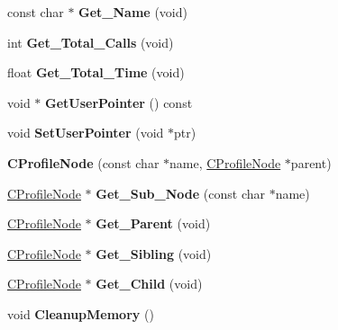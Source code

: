 \begin{DoxyCompactItemize}
const char $\ast$ {\bfseries Get\+\_\+\+Name} (void)
\item 
\mbox{\label{classCProfileNode_abfc5ebc32324b0881110e25cb3fc65e6}} 
int {\bfseries Get\+\_\+\+Total\+\_\+\+Calls} (void)
\item 
\mbox{\label{classCProfileNode_a75c164c4bc98ef802f4b8690050c429a}} 
float {\bfseries Get\+\_\+\+Total\+\_\+\+Time} (void)
\item 
\mbox{\label{classCProfileNode_a058d6860559f6c2e8af49af534dae991}} 
void $\ast$ {\bfseries Get\+User\+Pointer} () const
\item 
\mbox{\label{classCProfileNode_a853e6dabe024e9fb334222cea7c788e2}} 
void {\bfseries Set\+User\+Pointer} (void $\ast$ptr)
\item 
\mbox{\label{classCProfileNode_ab393ec70fb6ff1f0b840cafe0fe8e79d}} 
{\bfseries C\+Profile\+Node} (const char $\ast$name, \hyperlink{classCProfileNode}{C\+Profile\+Node} $\ast$parent)
\item 
\mbox{\label{classCProfileNode_a70c5d00b2b2c1d90d2bc9906a323f49d}} 
\hyperlink{classCProfileNode}{C\+Profile\+Node} $\ast$ {\bfseries Get\+\_\+\+Sub\+\_\+\+Node} (const char $\ast$name)
\item 
\mbox{\label{classCProfileNode_afe335d3cf4c294f6a2bae4595c8ccda6}} 
\hyperlink{classCProfileNode}{C\+Profile\+Node} $\ast$ {\bfseries Get\+\_\+\+Parent} (void)
\item 
\mbox{\label{classCProfileNode_aac31b3576cef057f06b2ff4e930f6d0c}} 
\hyperlink{classCProfileNode}{C\+Profile\+Node} $\ast$ {\bfseries Get\+\_\+\+Sibling} (void)
\item 
\mbox{\label{classCProfileNode_a171b7886d2db03dcc36201af90a70db3}} 
\hyperlink{classCProfileNode}{C\+Profile\+Node} $\ast$ {\bfseries Get\+\_\+\+Child} (void)
\item 
\mbox{\label{classCProfileNode_ac27e3242dddce582f00c547a1902f98b}} 
void {\bfseries Cleanup\+Memory} ()

\end{DoxyCompactItemize}
